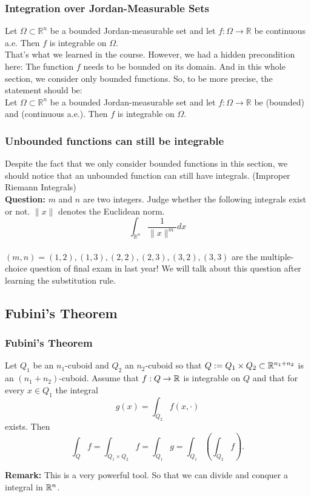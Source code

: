 \documentclass[12pt, t]{beamer}
\newcommand{\nullspace}{~\\[15pt]}
\newcommand{\Remark}{\textbf{Remark: }}
\newcommand{\Question}{\textbf{Question: }}
\begin{document}
\begin{frame}
    \frametitle{Integration over Jordan-Measurable Sets}
    Let $\Omega \subset \mathbb{R}^{n}$ be a bounded Jordan-measurable set and let $f: \Omega \rightarrow \mathbb{R}$ be continuous a.e. Then $f$ is integrable on $\Omega$.
    \nullspace
    That's what we learned in the course. However, we had a hidden precondition here: The function $f$ needs to be bounded on its domain. And in this whole section, we consider only bounded functions. So, to be more precise, the statement should be:
    \nullspace
    Let $\Omega \subset \mathbb{R}^{n}$ be a bounded Jordan-measurable set and let $f: \Omega \rightarrow \mathbb{R}$ be (bounded) and (continuous a.e.). Then $f$ is integrable on $\Omega$.
\end{frame}

\begin{frame}
    \frametitle{Unbounded functions can still be integrable}
    Despite the fact that we only consider bounded functions in this section, we should notice that an unbounded function can still have integrals. (Improper Riemann Integrals)
    \nullspace
    \Question
    $m$ and $n$ are two integers. Judge whether the following integrals exist or not. $\|x\|$ denotes the Euclidean norm.
    \[
        \int_{\mathbb{R}^{n}} \frac{1}{\|x\|^{m}} d x
    \]
    \nullspace
    $(m, n)=(1,2),(1,3),(2,2),(2,3),(3,2),(3,3)$ are the multiple-choice question of final exam in last year! We will talk about this question after learning the substitution rule.

\end{frame}

\subsection{Fubini's Theorem}
\begin{frame}
    \frametitle{Fubini's Theorem}
    Let $Q_1$ be an $n_1$-cuboid and $Q_2$ an $n_2$-cuboid so that $Q:=Q_1\times Q_2\subset\mathbb{R}^{n_1+n_2}$ is an $(n_1+n_2)$-cuboid. Assume that $f:Q\to\mathbb{R}$ is integrable on $Q$ and that for every $x\in Q_1$ the integral
    \[g(x)=\int_{Q_2}f(x,\cdot)\]
    exists. Then
    \[\int_Qf=\int_{Q_1\times Q_2}f=\int_{Q_1}g=\int_{Q_1}\left(\int_{Q_2}f\right).\]

    \Remark This is a very powerful tool. So that we can divide and conquer a integral in $\mathbb{R}^n$.
\end{frame}
\end{document}
